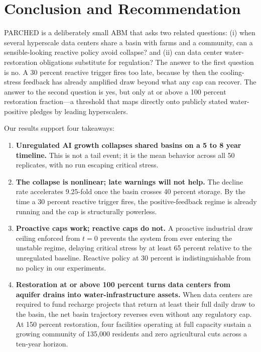 \documentclass[sigconf,nonacm]{acmart}
\begin{document}
\section{Conclusion and Recommendation}

PARCHED is a deliberately small ABM that asks two related questions: (i) when several hyperscale data centers share a basin with farms and a community, can a sensible-looking reactive policy avoid collapse? and (ii) can data center water-restoration obligations substitute for regulation? The answer to the first question is no. A 30 percent reactive trigger fires too late, because by then the cooling-stress feedback has already amplified draw beyond what any cap can recover. The answer to the second question is yes, but only at or above a 100 percent restoration fraction---a threshold that maps directly onto publicly stated water-positive pledges by leading hyperscalers.

Our results support four takeaways:

\begin{enumerate}
  \item \textbf{Unregulated AI growth collapses shared basins on a 5 to 8 year timeline.} This is not a tail event; it is the mean behavior across all 50 replicates, with no run escaping critical stress.
  \item \textbf{The collapse is nonlinear; late warnings will not help.} The decline rate accelerates 9.25-fold once the basin crosses 40 percent storage. By the time a 30 percent reactive trigger fires, the positive-feedback regime is already running and the cap is structurally powerless.
  \item \textbf{Proactive caps work; reactive caps do not.} A proactive industrial draw ceiling enforced from $t=0$ prevents the system from ever entering the unstable regime, delaying critical stress by at least 65 percent relative to the unregulated baseline. Reactive policy at 30 percent is indistinguishable from no policy in our experiments.
  \item \textbf{Restoration at or above 100 percent turns data centers from aquifer drains into water-infrastructure assets.} When data centers are required to fund recharge projects that return at least their full daily draw to the basin, the net basin trajectory reverses even without any regulatory cap. At 150 percent restoration, four facilities operating at full capacity sustain a growing community of 135{,}000 residents and zero agricultural cuts across a ten-year horizon.
\end{enumerate}
\end{document}
